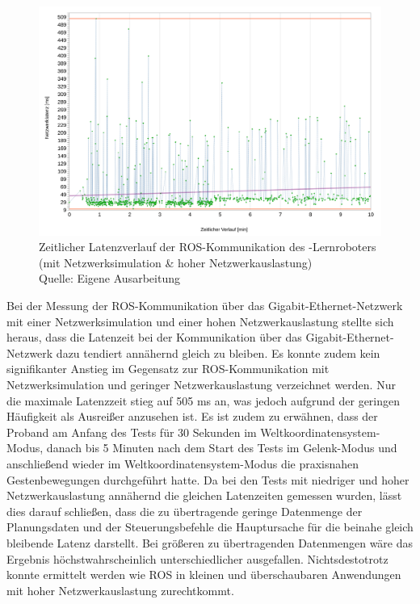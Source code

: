 \begin{figure}[htb]
	\centering
	\includegraphics[width=1.04\textwidth]{images/ergebnisse/ROS_App_mit_Netzwerksimulation_und_hohe_Auslastung}
	\caption[Zeitlicher Latenzverlauf der ROS-Kommunikation des -Lernroboters (mit Netzwerksimulation \& hoher Netzwerkauslastung)]{Zeitlicher Latenzverlauf der ROS-Kommunikation des -Lernroboters (mit Netzwerksimulation \& hoher Netzwerkauslastung)\\Quelle: Eigene Ausarbeitung}
	\label{fig:measurement_robot_ros_with_network_simulation_high_network_traffic}
\end{figure}
\FloatBarrier

Bei der Messung der ROS-Kommunikation über das Gigabit-Ethernet-Netzwerk mit einer Netzwerksimulation und einer hohen Netzwerkauslastung stellte sich heraus, dass die Latenzeit bei der Kommunikation über das Gigabit-Ethernet-Netzwerk dazu tendiert annähernd gleich zu bleiben. Es konnte zudem kein signifikanter Anstieg im Gegensatz zur ROS-Kommunikation mit Netzwerksimulation und geringer Netzwerkauslastung verzeichnet werden. Nur die maximale Latenzzeit stieg auf 505 ms an, was jedoch aufgrund der geringen Häufigkeit als Ausreißer anzusehen ist. Es ist zudem zu erwähnen, dass der Proband am Anfang des Tests für 30 Sekunden im Weltkoordinatensystem-Modus, danach bis 5 Minuten nach dem Start des Tests im Gelenk-Modus und anschließend wieder im Weltkoordinatensystem-Modus die praxisnahen Gestenbewegungen durchgeführt hatte. Da bei den Tests mit niedriger und hoher Netzwerkauslastung annähernd die gleichen Latenzeiten gemessen wurden, lässt dies darauf schließen, dass die zu übertragende geringe Datenmenge der Planungsdaten und der Steuerungsbefehle die Hauptursache für die beinahe gleich bleibende Latenz darstellt. Bei größeren zu übertragenden Datenmengen wäre das Ergebnis höchstwahrscheinlich unterschiedlicher ausgefallen. Nichtsdestotrotz konnte ermittelt werden wie ROS in kleinen und überschaubaren Anwendungen mit hoher Netzwerkauslastung zurechtkommt.

